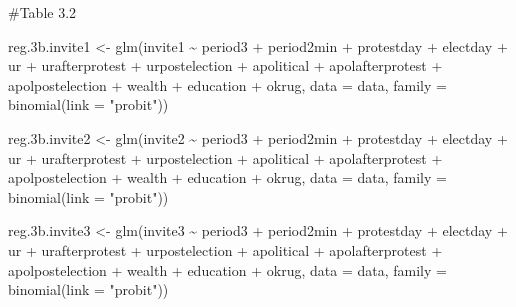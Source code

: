 \documentclass[
  letterpaper,
  DIV=11,
  numbers=noendperiod]{scrartcl}
\newenvironment{Shaded}{\begin{snugshade}}{\end{snugshade}}
\newcommand{\AttributeTok}[1]{\textcolor[rgb]{0.40,0.45,0.13}{#1}}
\newcommand{\CommentTok}[1]{\textcolor[rgb]{0.37,0.37,0.37}{#1}}
\newcommand{\FloatTok}[1]{\textcolor[rgb]{0.68,0.00,0.00}{#1}}
\newcommand{\FunctionTok}[1]{\textcolor[rgb]{0.28,0.35,0.67}{#1}}
\newcommand{\NormalTok}[1]{\textcolor[rgb]{0.00,0.23,0.31}{#1}}
\newcommand{\OtherTok}[1]{\textcolor[rgb]{0.00,0.23,0.31}{#1}}
\newcommand{\SpecialCharTok}[1]{\textcolor[rgb]{0.37,0.37,0.37}{#1}}
\newcommand{\StringTok}[1]{\textcolor[rgb]{0.13,0.47,0.30}{#1}}
\begin{document}
\begin{Shaded}
\begin{Highlighting}[]
\CommentTok{\#Table 3.2}

\NormalTok{reg}\FloatTok{.3}\NormalTok{b.invite1 }\OtherTok{\textless{}{-}} \FunctionTok{glm}\NormalTok{(invite1 }\SpecialCharTok{\textasciitilde{}}\NormalTok{ period3 }\SpecialCharTok{+}\NormalTok{ period2min }\SpecialCharTok{+}\NormalTok{ protestday }\SpecialCharTok{+}\NormalTok{ electday }\SpecialCharTok{+}
\NormalTok{                        ur }\SpecialCharTok{+}\NormalTok{ urafterprotest }\SpecialCharTok{+}\NormalTok{ urpostelection }\SpecialCharTok{+}
\NormalTok{                        apolitical }\SpecialCharTok{+}\NormalTok{ apolafterprotest }\SpecialCharTok{+}\NormalTok{ apolpostelection }\SpecialCharTok{+}
\NormalTok{                        wealth }\SpecialCharTok{+}\NormalTok{ education }\SpecialCharTok{+}\NormalTok{ okrug, }\AttributeTok{data   =}\NormalTok{ data,}
                      \AttributeTok{family =} \FunctionTok{binomial}\NormalTok{(}\AttributeTok{link =} \StringTok{"probit"}\NormalTok{))}

\NormalTok{reg}\FloatTok{.3}\NormalTok{b.invite2 }\OtherTok{\textless{}{-}} \FunctionTok{glm}\NormalTok{(invite2 }\SpecialCharTok{\textasciitilde{}}\NormalTok{ period3 }\SpecialCharTok{+}\NormalTok{ period2min }\SpecialCharTok{+}\NormalTok{ protestday }\SpecialCharTok{+}\NormalTok{ electday }\SpecialCharTok{+}
\NormalTok{                        ur }\SpecialCharTok{+}\NormalTok{ urafterprotest }\SpecialCharTok{+}\NormalTok{ urpostelection }\SpecialCharTok{+}
\NormalTok{                        apolitical }\SpecialCharTok{+}\NormalTok{ apolafterprotest }\SpecialCharTok{+}\NormalTok{ apolpostelection }\SpecialCharTok{+}
\NormalTok{                        wealth }\SpecialCharTok{+}\NormalTok{ education }\SpecialCharTok{+}\NormalTok{ okrug, }\AttributeTok{data   =}\NormalTok{ data,}
                      \AttributeTok{family =} \FunctionTok{binomial}\NormalTok{(}\AttributeTok{link =} \StringTok{"probit"}\NormalTok{))}

\NormalTok{reg}\FloatTok{.3}\NormalTok{b.invite3 }\OtherTok{\textless{}{-}} \FunctionTok{glm}\NormalTok{(invite3 }\SpecialCharTok{\textasciitilde{}}\NormalTok{ period3 }\SpecialCharTok{+}\NormalTok{ period2min }\SpecialCharTok{+}\NormalTok{ protestday }\SpecialCharTok{+}\NormalTok{ electday }\SpecialCharTok{+}
\NormalTok{                        ur }\SpecialCharTok{+}\NormalTok{ urafterprotest }\SpecialCharTok{+}\NormalTok{ urpostelection }\SpecialCharTok{+}
\NormalTok{                        apolitical }\SpecialCharTok{+}\NormalTok{ apolafterprotest }\SpecialCharTok{+}\NormalTok{ apolpostelection }\SpecialCharTok{+}
\NormalTok{                        wealth }\SpecialCharTok{+}\NormalTok{ education }\SpecialCharTok{+}\NormalTok{ okrug, }\AttributeTok{data   =}\NormalTok{ data,}
                      \AttributeTok{family =} \FunctionTok{binomial}\NormalTok{(}\AttributeTok{link =} \StringTok{"probit"}\NormalTok{))}


\end{Highlighting}
\end{Shaded}
\end{document}
